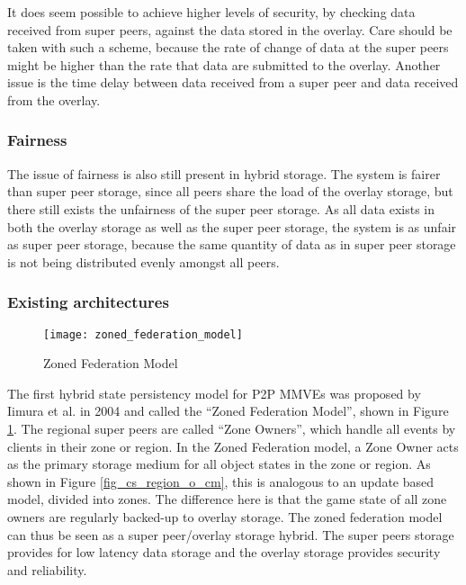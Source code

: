 It does seem possible to achieve higher levels of security, by checking data received from super peers, against the data stored in the overlay. Care should be taken with such a scheme, because the rate of change of data at the super peers might be higher than the rate that data are submitted to the overlay. Another issue is the time delay between data received from a super peer and data received from the overlay.

\subsubsection{Fairness}

The issue of fairness is also still present in hybrid storage. The system is fairer than super peer storage, since all peers share the load of the overlay storage, but there still exists the unfairness of the super peer storage. As all data exists in both the overlay storage as well as the super peer storage, the system is as unfair as super peer storage, because the same quantity of data as in super peer storage is not being distributed evenly amongst all peers.

\subsubsection{Existing architectures}

\begin{figure}[htbp]
 \centering
 \texttt{[image: zoned\_federation\_model]}
 \caption{Zoned Federation Model \cite{zoned_federation}}
 \label{fig_zoned_federation_model}
\end{figure}
%
The first hybrid state persistency model for P2P MMVEs was proposed by Iimura et al. in 2004 \cite{zoned_federation} and called the ``Zoned Federation Model'', shown in Figure \ref{fig_zoned_federation_model}. The regional super peers are called ``Zone Owners'', which handle all events by clients in their zone or region. In the Zoned Federation model, a Zone Owner acts as the primary storage medium for all object states in the zone or region. As shown in Figure \ref{fig_cs_region_o_cm}, this is analogous to an update based model, divided into zones. The difference here is that the game state of all zone owners are regularly backed-up to overlay storage. The zoned federation model can thus be seen as a super peer/overlay storage hybrid. The super peers storage provides for low latency data storage and the overlay storage provides security and reliability.


